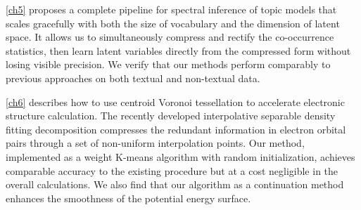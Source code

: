 \cref{ch5} proposes a complete pipeline for spectral inference of topic
models that scales gracefully with both the size of vocabulary and the dimension
of latent space. It allows us to simultaneously compress and rectify the 
co\hyp{}occurrence statistics, then learn latent variables directly from the
compressed form without losing visible precision. We verify that our
methods perform comparably to previous approaches on both textual and
non-textual data.

\cref{ch6} describes how to use centroid Voronoi tessellation to accelerate
electronic structure calculation. The recently developed interpolative separable
density fitting decomposition compresses the redundant information in electron
orbital pairs through a set of non-uniform interpolation points. Our method,
implemented as a weight K-means algorithm with random initialization, achieves
comparable accuracy to the existing procedure but at a cost negligible in the
overall calculations. We also find that our algorithm as a continuation method
enhances the smoothness of the potential energy surface.